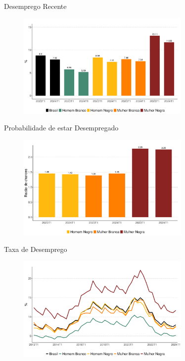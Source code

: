 \documentclass[10pt, xcolor=x11names,compress]{beamer}
\begin{document}
	\begin{frame}{Desemprego Recente}
		\begin{figure}
			\centering
			\includegraphics[width = 0.75\textwidth]{figures_output/unemp.pdf}
		\end{figure}
	\end{frame}
	
	\begin{frame}{Probabilidade de estar Desempregado}
		\begin{figure}
			\centering
			\includegraphics[width = 0.75\textwidth]{figures_output/frac_unemp.pdf}
		\end{figure}
	\end{frame}
	
	\begin{frame}{Taxa de Desemprego}
		\begin{figure}
			\centering
			\includegraphics[width = 0.75\textwidth]{figures_output/unemp_br_gen_raca.pdf}
		\end{figure}
	\end{frame}			
	
\end{document}
